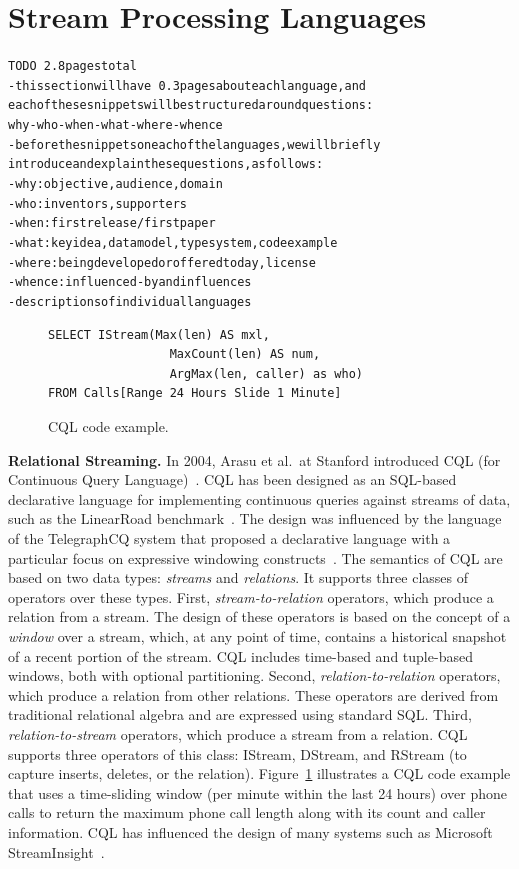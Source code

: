 \section{Stream Processing Languages}\label{sec:languages}

\begin{alltt}TODO\scriptsize ~2.8 pages total
- this section will have ~0.3 pages about each language, and
  each of these snippets will be structured around questions:
  why-who-when-what-where-whence
- before the snippets on each of the languages, we will briefly
  introduce and explain these questions, as follows:
  - why: objective, audience, domain
  - who: inventors, supporters
  - when: first release / first paper
  - what: key idea, data model, type system, code example
  - where: being developed or offered today, license
  - whence: influenced-by and influences
- descriptions of individual languages
\end{alltt}

\begin{figure}[!h]
\begin{lstlisting}
SELECT IStream(Max(len) AS mxl,
                 MaxCount(len) AS num,
                 ArgMax(len, caller) as who)
FROM Calls[Range 24 Hours Slide 1 Minute]
\end{lstlisting}
\vspace*{-4mm}
\caption{\label{fig:cql}CQL code example.}
\end{figure}

\textbf{Relational Streaming.}
In 2004, Arasu et al.\ at Stanford introduced CQL (for Continuous
Query Language)~\cite{arasu_widom_2004}. CQL has been designed as an
SQL-based declarative language for implementing continuous queries
against streams of data, such as the LinearRoad
benchmark~\cite{arasu_et_al_2004}. The design was influenced by the language of
the TelegraphCQ system that proposed a declarative language with a
particular focus on expressive windowing
constructs~\cite{chandrasekaran_et_al_2003}. The semantics of CQL are
based on two data types: \emph{streams} and \emph{relations}. It
supports three classes of operators over these types. First,
\emph{stream-to-relation} operators, which produce a relation from a
stream.  The design of these operators is based on the concept of a
\emph{window} over a stream, which, at any point of time, contains a
historical snapshot of a recent portion of the stream. CQL includes
time-based and tuple-based windows, both with optional
partitioning. Second, \emph{relation-to-relation} operators, which
produce a relation from other relations. These operators are derived
from traditional relational algebra and are expressed using standard
SQL. Third, \emph{relation-to-stream} operators, which produce a
stream from a relation. CQL supports three operators of this class:
IStream, DStream, and RStream (to capture inserts, deletes, or the
relation).  Figure~\ref{fig:cql} illustrates a CQL code example that
uses a time-sliding window (per minute within the last 24 hours) over
phone calls to return the maximum phone call length along with its
count and caller information. CQL has influenced the design of many
systems such as Microsoft StreamInsight~\cite{ali_et_al_2009}.


